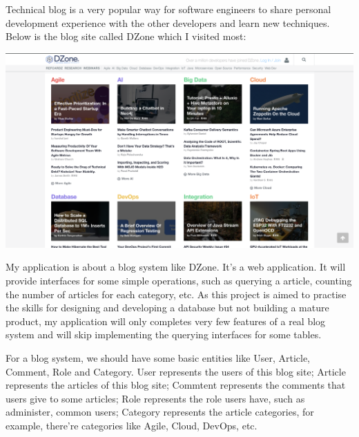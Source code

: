 \documentclass[11pt]{homework}
\begin{document}
\maketitle


Technical blog is a very popular way for software engineers to share personal development experience 
with the other developers and learn new techniques. Below is the blog site called DZone which I visited
most:

\begin{center}
  \includegraphics[scale=0.25]{images/DZone}
\end{center}

My application is about a blog system like DZone. It's a web application. It will provide interfaces for some simple operations,
such as querying a article, counting the number of articles for each category, etc. As this project is 
aimed to practise the skills for designing and developing a database but not building a mature product,
my application will only completes very few features of a real blog system and will skip implementing
the querying interfaces for some tables.

For a blog system, we should have some basic entities like User, Article, Comment, Role and Category. User
represents the users of this blog site; Article represents the articles of this blog site; Commtent represents
the comments that users give to some articles; Role represents the role users have, such as administer, common
users; Category represents the article categories, for example, there're categories like Agile, Cloud, DevOps, etc.
\end{document}
